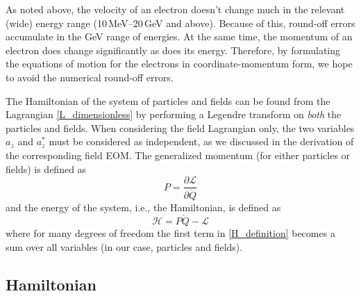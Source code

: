 \documentclass[11pt]{article}
\newcommand{\LL}{\mathcal{L}}
\newcommand{\HH}{\mathcal{H}}
\begin{document}
As noted above, the velocity of an electron doesn't change much in the relevant (wide) energy range 
(10\,MeV--20\,GeV and above). Because of this, round-off errors accumulate in the GeV range of energies. 
At the same time, the momentum of an electron does change significantly as does its energy.  
Therefore, by formulating the equations of motion for the electrons in coordinate-momentum form,
we hope to avoid the numerical round-off errors.

The Hamiltonian of the system of particles and fields can be found from the Lagrangian \eqref{L_dimensionless}
by performing a Legendre transform on \textit{both} the particles and fields. When considering the 
field Lagrangian only, the two variables $a_z$ and $a_z^*$ must be considered as independent, as we discussed
in the derivation of the corresponding field EOM. The generalized momentum (for either particles or fields)
is defined as
%
\begin{equation}
P = \frac{\partial \LL}{\partial \dot{Q}}
\label{Generalized_P}
\end{equation}
%
and the energy of the system, i.e., the Hamiltonian, is defined as
%
\begin{equation}
\HH = P\dot{Q} - \LL
\label{H_definition}
\end{equation}
%
where for many degrees of freedom the first term in \eqref{H_definition} becomes a sum over all
variables (in our case, particles and fields).

\subsection{Hamiltonian}
\label{Hamiltonian}
\end{document}
